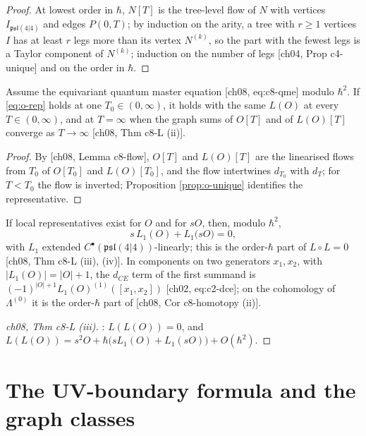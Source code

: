 \begin{proof}
At lowest order in $\hbar$, $N[T]$ is the tree-level flow of $N$ with vertices $I_{\mathfrak{psl}(4|4)}$ and edges $P(0,T)$; by induction on the arity, a tree with $r\ge1$ vertices $I$ has at least $r$ legs more than its vertex $N^{(k)}$, so the part with the fewest legs is a Taylor component of $N^{(k)}$; induction on the number of legs [ch04, Prop c4-unique] and on the order in $\hbar$.
\end{proof}

\begin{proposition}
\label{prop:o-Tindep}
Assume the equivariant quantum master equation [ch08, eq:c8-qme] modulo $\hbar^2$. If \eqref{eq:o-rep} holds at one $T_0\in(0,\infty)$, it holds with the same $L(O)$ at every $T\in(0,\infty)$, and at $T=\infty$ when the graph sums of $O[T]$ and of $L(O)[T]$ converge as $T\to\infty$ [ch08, Thm c8-L (ii)].
\end{proposition}

\begin{proof}
By [ch08, Lemma c8-flow], $O[T]$ and $L(O)[T]$ are the linearised flows from $T_0$ of $O[T_0]$ and $L(O)[T_0]$, and the flow intertwines $d_{T_0}$ with $d_T$; for $T<T_0$ the flow is inverted; Proposition \ref{prop:o-unique} identifies the representative.
\end{proof}

\begin{theorem}
\label{thm:o-cocycle}
If local representatives exist for $O$ and for $sO$, then, modulo $\hbar^2$,
\begin{equation}
s\,L_1(O)+L_1\big(sO\big)=0 ,
\label{eq:o-cocycle}
\end{equation}
with $L_1$ extended $C^\bullet(\mathfrak{psl}(4|4))$-linearly; this is the order-$\hbar$ part of $L\circ L=0$ [ch08, Thm c8-L (iii), (iv)]. In components on two generators $x_1,x_2$, with $|L_1(O)|=|O|+1$, the $d_{CE}$ term of the first summand is $(-1)^{|O|+1}L_1(O)^{(1)}([x_1,x_2])$ [ch02, eq:c2-dce]; on the cohomology of $\Lambda^{(0)}$ it is the order-$\hbar$ part of [ch08, Cor c8-homotopy (ii)].
\end{theorem}

\begin{proof}
[ch08, Thm c8-L (iii)]: $L(L(O))=0$, and $L(L(O))=s^2O+\hbar\big(sL_1(O)+L_1(sO)\big)+O(\hbar^2)$.
\end{proof}

\section{The UV-boundary formula and the graph classes}


